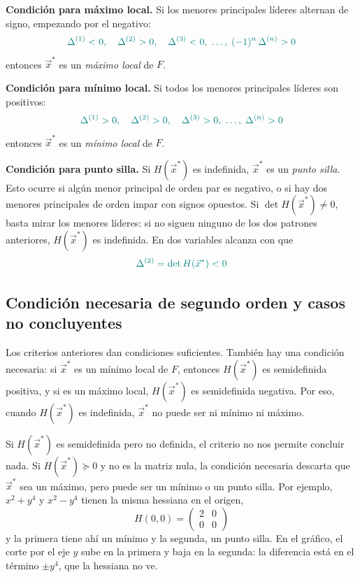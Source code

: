 \documentclass{article}
\newcommand{\vect}[1]{\vec{#1}}
\begin{document}
\medskip

\noindent\textbf{Condición para máximo local.}
Si los menores principales líderes alternan de signo, empezando por el negativo:
\[\color{teal}
\Delta^{(1)} < 0,\quad \Delta^{(2)} > 0,\quad \Delta^{(3)} < 0,\;\dots,\;(-1)^n\,\Delta^{(n)} > 0
\]
entonces \(\vect{x}^*\) es un \emph{máximo local} de \(F\).

\medskip

\noindent\textbf{Condición para mínimo local.}
Si todos los menores principales líderes son positivos:
\[\color{teal}
\Delta^{(1)} > 0,\quad \Delta^{(2)} > 0,\quad \Delta^{(3)} > 0,\;\dots,\;\Delta^{(n)} > 0
\]
entonces \(\vect{x}^*\) es un \emph{mínimo local} de \(F\).

\medskip

\noindent\textbf{Condición para punto silla.}
Si \(H(\vect{x}^*)\) es indefinida, \(\vect{x}^*\) es un \emph{punto silla}. Esto ocurre si algún menor principal de orden par es negativo, o si hay dos menores principales de orden impar con signos opuestos. Si \(\det H(\vect{x}^*)\neq0\), basta mirar los menores líderes: si no siguen ninguno de los dos patrones anteriores, \(H(\vect{x}^*)\) es indefinida. En dos variables alcanza con que
\[\color{teal}
\Delta^{(2)}=\det H(\vect{x}^*)<0
\]

\subsection*{Condición necesaria de segundo orden y casos no concluyentes}

Los criterios anteriores dan condiciones suficientes. También hay una condición necesaria: si \(\vect{x}^*\) es un mínimo local de \(F\), entonces \(H(\vect{x}^*)\) es semidefinida positiva, y si es un máximo local, \(H(\vect{x}^*)\) es semidefinida negativa. Por eso, cuando \(H(\vect{x}^*)\) es indefinida, \(\vect{x}^*\) no puede ser ni mínimo ni máximo.

Si \(H(\vect{x}^*)\) es semidefinida pero no definida, el criterio no nos permite concluir nada. Si \(H(\vect{x}^*)\succeq 0\) y no es la matriz nula, la condición necesaria descarta que \(\vect{x}^*\) sea un máximo, pero puede ser un mínimo o un punto silla. Por ejemplo, \(x^2+y^4\) y \(x^2-y^4\) tienen la misma hessiana en el origen,
\[
H(0,0)=\begin{pmatrix}2&0\\[4pt]0&0\end{pmatrix}
\]
y la primera tiene ahí un mínimo y la segunda, un punto silla. En el gráfico, el corte por el eje \(y\) sube en la primera y baja en la segunda: la diferencia está en el término \(\pm y^4\), que la hessiana no ve.
\end{document}
